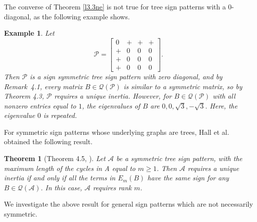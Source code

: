 \documentclass[a4paper, 10pt]{article}
\newtheorem{theorem}{Theorem}[section]
\newtheorem{eg}{Example}[section]
\numberwithin{equation}{section}
\begin{document}
	
	
	
	
	The converse of Theorem \ref{l3.3ne} is not true for tree sign patterns with a $0$-diagonal, as the following example shows.
	\begin{eg}
		Let $$\mathcal{P}=\begin{bmatrix}
			0&+&+&+\\+&0&0&0\\+&0&0&0\\+&0&0&0
		\end{bmatrix}.$$ Then $\mathcal{P}$ is a sign symmetric tree sign pattern with zero diagonal, and by Remark~4.1\cite{2018}, every matrix $B\in\mathcal{Q}(\mathcal{P})$ is similar to a symmetric matrix, so by Theorem 4.3\cite{2001}, $\mathcal{P}$ requires a unique inertia. However, for $B\in \mathcal{Q(\mathcal{P})}$ with all nonzero entries equal to $1$, the eigenvalues of $B$ are $0,0,\sqrt{3},-\sqrt{3}$. Here, the eigenvalue $0$ is repeated.
	\end{eg}
	
	
	
	
	For symmetric sign patterns whose underlying graphs are trees, Hall et al. \cite{2001} obtained the following result.
	\begin{theorem}[Theorem 4.5, \cite{2001}]  Let $\mathcal{A}$ be a symmetric tree sign pattern, with the maximum length of the cycles in A equal to $m\geq 1$. Then $\mathcal{A}$ requires a unique inertia if and only if all the terms in $E_m(B)$ have the same sign for any $B \in \mathcal{Q}(\mathcal{A})$. In this case, $\mathcal{A}$ requires rank $m$.
	\end{theorem}
	
	
	We investigate the above result for general sign patterns which are not necessarily symmetric.
	
\end{document}
